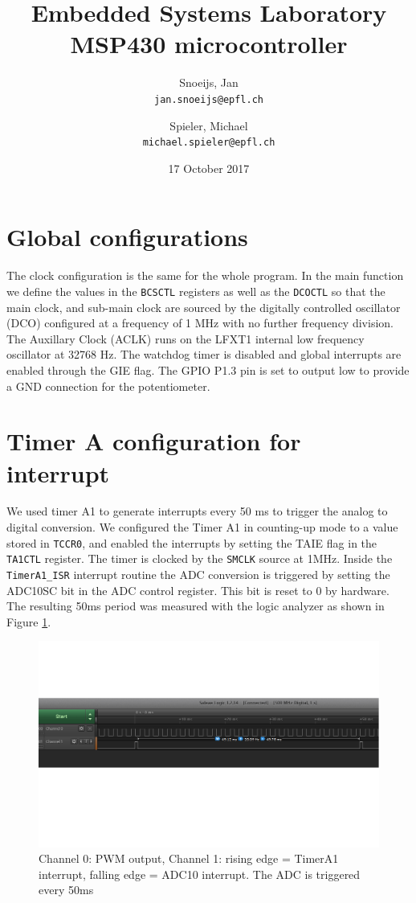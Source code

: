 \documentclass{article}
\title{Embedded Systems Laboratory \\
        MSP430 microcontroller}
\author{
  Snoeijs, Jan\\
    \texttt{jan.snoeijs@epfl.ch}
  \and
  Spieler, Michael\\
  \texttt{michael.spieler@epfl.ch}
}
\date{17 October 2017}
\begin{document}
\maketitle

\section{Global configurations}

The clock configuration is the same for the whole program. In the main function we define the values in the \verb'BCSCTL' registers as well as the \verb'DCOCTL' so that the main clock, and sub-main clock are sourced by the digitally controlled oscillator (DCO) configured at a frequency of 1 MHz with no further frequency division. The Auxillary Clock (ACLK) runs on the LFXT1 internal low frequency oscillator at 32768 Hz. The watchdog timer is disabled and global interrupts are enabled through the GIE flag. The GPIO P1.3 pin is set to output low to provide a GND connection for the potentiometer.

\section{Timer A configuration for interrupt}

We used timer A1 to generate interrupts every 50 ms to trigger the analog to digital conversion. We configured the Timer A1 in counting-up mode to a value stored in \verb'TCCR0', and enabled the interrupts by setting the TAIE flag in the \verb'TA1CTL' register. The timer is clocked by the \verb'SMCLK' source at 1MHz. Inside the \verb'TimerA1_ISR' interrupt routine the ADC conversion is triggered by setting the ADC10SC bit in the ADC control register. This bit is reset to 0 by hardware. The resulting 50ms period was measured with the logic analyzer as shown in Figure \ref{fig:adc}.

\begin{figure}[H]
    \centering
    \includegraphics[width=\textwidth]{images/Capture2}
    \caption{Channel 0: PWM output, Channel 1: rising edge = TimerA1 interrupt, falling edge = ADC10 interrupt. The ADC is triggered every 50ms}
    \label{fig:adc}
\end{figure}
\end{document}
